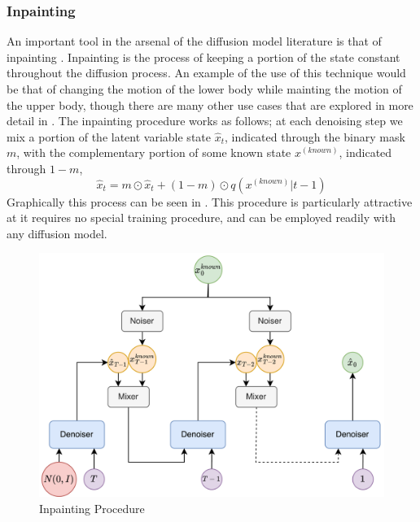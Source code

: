 \subsubsection{Inpainting}
\label{sec:diffusion_method_inpainting}

An important tool in the arsenal of the diffusion model literature is that of inpainting \cite{diffusion_inpainting}. Inpainting is the process of keeping a portion of the state constant throughout the diffusion process. An example of the use of this technique would be that of changing the motion of the lower body while mainting the motion of the upper body, though there are many other use cases that are explored in more detail in . The inpainting procedure works as follows; at each denoising step we mix a portion of the latent variable state $\hat{x}_t$, indicated through the binary mask $m$, with the complementary portion of some known state $x^{(known)}$, indicated through $1-m$, 
\begin{equation}
    \hat{x}_{t} = m \odot \hat{x}_t + (1-m) \odot q(x^{(known)}|t-1)
\end{equation}
Graphically this process can be seen in . This procedure is particularly attractive at it requires no special training procedure, and can be employed readily with any diffusion model.

\begin{figure}[!ht]
    \centering
    \includegraphics[width=1\textwidth]{Figures/diffusion/Inpainting.png}
    \caption{Inpainting Procedure}
    \label{fig:inpainting}
\end{figure}


